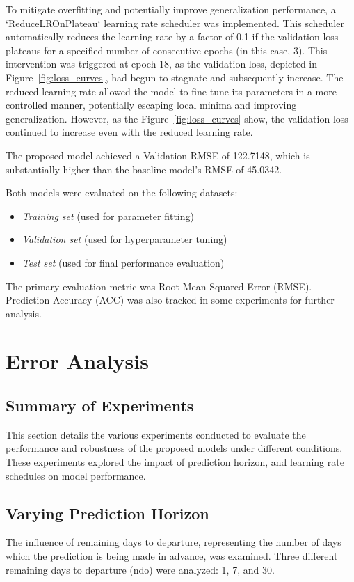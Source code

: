 \documentclass[conference]{IEEEtran}
\begin{document}
To mitigate overfitting and potentially improve generalization performance, a `ReduceLROnPlateau` learning rate scheduler was implemented. This scheduler automatically reduces the learning rate by a factor of 0.1 if the validation loss plateaus for a specified number of consecutive epochs (in this case, 3). This intervention was triggered at epoch 18, as the validation loss, depicted in Figure~\ref{fig:loss_curves}, had begun to stagnate and subsequently increase. The reduced learning rate allowed the model to fine-tune its parameters in a more controlled manner, potentially escaping local minima and improving generalization. However, as the Figure~\ref{fig:loss_curves} show, the validation loss continued to increase even with the reduced learning rate.

The proposed model achieved a Validation RMSE of 122.7148, which is substantially higher than the baseline model's RMSE of 45.0342.

Both models were evaluated on the following datasets:

\begin{itemize}
    \item \textit{Training set} (used for parameter fitting)
    \item \textit{Validation set} (used for hyperparameter tuning)
    \item \textit{Test set} (used for final performance evaluation)
\end{itemize}

The primary evaluation metric was Root Mean Squared Error (RMSE). Prediction Accuracy (ACC) was also tracked in some experiments for further analysis.


\section{Error Analysis}\label{8}
\subsection{Summary of Experiments}\label{8a}
This section details the various experiments conducted to evaluate the performance and robustness of the proposed models under different conditions. These experiments explored the impact of prediction horizon, and learning rate schedules on model performance.

\subsection{Varying Prediction Horizon}
The influence of remaining days to departure, representing the number of days which the prediction is being made in advance, was examined. Three different remaining days to departure (ndo) were analyzed: 1, 7, and 30.
\end{document}
